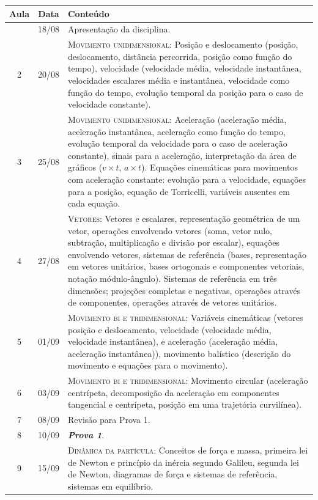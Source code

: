 \begin{center}
\begin{longtable}{ccp{70mm}}
\toprule
Aula & Data & Conteúdo \\
\midrule
\endhead
\bottomrule
\endfoot
1	 & 	18/08	 & 	Apresentação da disciplina. \\
2	 & 	20/08	 & 	\textsc{Movimento unidimensional:} Posição e deslocamento (posição, deslocamento, distância percorrida, posição como função do tempo), velocidade (velocidade média, velocidade instantânea, velocidades escalares média e instantânea, velocidade como função do tempo, evolução temporal da posição para o caso de velocidade constante). \\
3	 & 	25/08	 & 	\textsc{Movimento unidimensional:} Aceleração (aceleração média, aceleração instantânea, aceleração como função do tempo, evolução temporal da velocidade para o caso de aceleração constante), sinais para a aceleração, interpretação da área de gráficos ($v \times t$, $a \times  t$). Equações cinemáticas para movimentos com aceleração constante: evolução para a velocidade, equações para a posição, equação de Torricelli, variáveis ausentes em cada equação. \\
4	 & 	27/08	 & 	\textsc{Vetores:} Vetores e escalares, representação geométrica de um vetor, operações envolvendo vetores (soma, vetor nulo, subtração, multiplicação e divisão por escalar), equações envolvendo vetores, sistemas de referência (bases, representação em vetores unitários, bases ortogonais e componentes vetoriais, notação módulo-ângulo). Sistemas de referência em três dimensões; projeções completas e negativas, operações através de componentes, operações através de vetores unitários. \\
5	 & 	01/09	 &  	\textsc{Movimento bi e tridimensional:} Variáveis cinemáticas (vetores posição e deslocamento, velocidade (velocidade média, velocidade instantânea), e aceleração (aceleração média, aceleração instantânea)), movimento balístico (descrição do movimento e equações para o movimento). \\
6	 & 	03/09	 & 	\textsc{Movimento bi e tridimensional:} Movimento circular (aceleração centrípeta, decomposição da aceleração em componentes tangencial e centrípeta, posição em uma trajetória curvilínea). \\
7	 & 	08/09	 & 	Revisão para Prova 1. \\
8	 &	10/09	 &	\textbf{\textit{Prova 1}}. \\
9	 & 	15/09	 & 	\textsc{Dinâmica da partícula:} Conceitos de força e massa, primeira lei de Newton e princípio da inércia segundo Galileu, segunda lei de Newton, diagramas de força e sistemas de referência, sistemas em equilíbrio. \\

\end{longtable}
\end{center}
